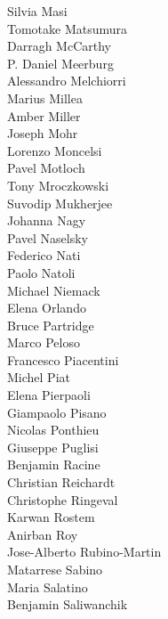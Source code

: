 \documentclass[PICOAPC.tex]{subfiles}
\begin{document}
{\begin{multicols}{4}
Silvia Masi                     \\
Tomotake Matsumura              \\
Darragh McCarthy                \\
P. Daniel Meerburg              \\
Alessandro Melchiorri           \\
Marius Millea                   \\
Amber Miller                    \\
Joseph Mohr                     \\
Lorenzo Moncelsi                \\
Pavel Motloch                   \\
Tony Mroczkowski                \\
Suvodip Mukherjee               \\
Johanna Nagy                    \\
Pavel Naselsky                  \\
Federico Nati                   \\
Paolo Natoli                    \\
Michael Niemack                 \\
Elena Orlando                   \\
Bruce Partridge                 \\
Marco Peloso                    \\
Francesco Piacentini            \\
Michel Piat                     \\
Elena Pierpaoli   \\
Giampaolo Pisano                \\
Nicolas Ponthieu                \\
Giuseppe Puglisi                \\
Benjamin Racine                 \\
Christian Reichardt             \\
Christophe Ringeval             \\
Karwan Rostem                   \\
Anirban Roy                     \\
Jose-Alberto Rubino-Martin      \\
Matarrese Sabino                \\
Maria Salatino                  \\
Benjamin Saliwanchik            \\

\end{multicols}}
\end{document}
